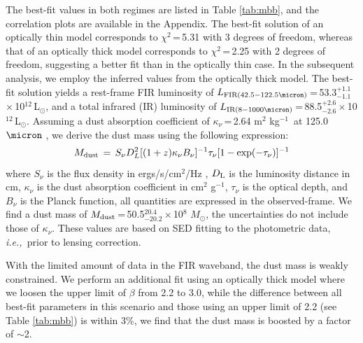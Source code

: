 \documentclass[twocolumn,apj,numberedappendix]{emulateapj}
\newcommand{\Msun}{\mbox{$M_{\odot}$}}
\newcommand{\Lsun}{\mbox{L$_{\odot}$}}
\newcommand{\ie}{{\sl i.e.,~}}
\newcommand{\pmOne}{\mbox{$^{-1}$}}
\begin{document}

The best-fit values in both regimes are listed in Table \ref{tab:mbb}, and the correlation plots are available in the Appendix. The best-fit solution of an optically thin
model corresponds to $\chi^2$\,=\,5.31 with 3 degrees of freedom, whereas that of an optically thick model
corresponds to $\chi^2$\,=\,2.25 with 2 degrees of freedom, suggesting a better fit than in the optically thin
case. In the subsequent analysis, we employ the inferred values from the optically thick model.
The best-fit solution yields a rest-frame FIR luminosity of $L_{\rm FIR (42.5-122.5\micron)}$\,=\,53.3$^{+1.1}_{-1.1}$\,$\times$\,10$^{12}$\,\Lsun, and a total infrared (IR) luminosity of $L_{\rm IR (8-1000 \micron)}$\,=\,88.5$^{+2.6}_{-2.6}$\,$\times$\,10$
^{12}$\,\Lsun. Assuming a dust absorption coefficient of $\kappa_{\nu}$\,=\,2.64 m$^2$ kg\pmOne\ at 125.0 $
\micron$ \citep{Dunne03a}, we derive the dust mass using the following expression:
\begin{equation}
M_{\rm dust}\,=\,S_{\nu} D_{L}^2 [(1 + z) \kappa_{\nu} B_{\nu}]^{-1} \tau_{\nu} [1-
\exp(-\tau_{\nu})]^{-1}
\end{equation}
where $S_{\nu}$ is the flux density in ergs/s/cm$^{2}$/Hz , $D_{\rm L}$ is the luminosity distance in cm, $\kappa_{\nu}$ is the dust
absorption coefficient in cm$^2$ g\pmOne, $\tau_{\nu}$ is the optical depth, and $B_{\nu}$ is the Planck function,
all quantities are expressed in the observed-frame. We find a dust mass of $M_{\rm dust}$\,=\,50.5$^{20.4}_{-20.2}\times$10$^8$\,\,\Msun, the uncertainties do not include those of $\kappa_{\nu}$. These values are based on SED fitting to the photometric data, \ie prior
to lensing correction. 

With the limited amount of data in the FIR waveband, the dust mass is weakly constrained. 
We perform an additional fit using an optically thick model where we loosen the upper limit of $\beta$ from 2.2 to 3.0, while the difference between all best-fit parameters in this scenario and those using an upper limit of 2.2 (see Table \ref{tab:mbb}) is within 3\%, we find that the dust mass is boosted by a factor of $\sim$2. 
\end{document}
